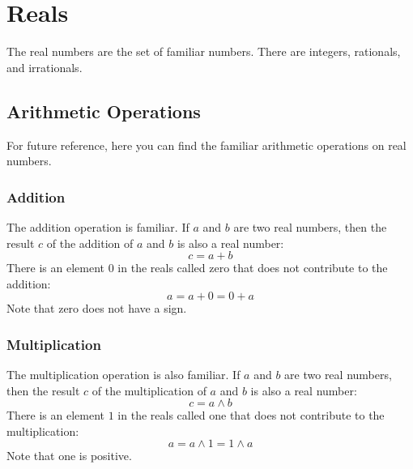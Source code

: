 \chapter{Reals}
The real numbers are the set of familiar numbers. There are integers, rationals, and irrationals.
\section{Arithmetic Operations}
For future reference, here you can find the familiar arithmetic operations on real numbers.
\subsection{Addition}
The addition operation is familiar. If $a$ and $b$ are two real numbers, then the result $c$ of the addition of $a$ and $b$ is also a real number:
\begin{equation}
    c = a + b
\end{equation}
There is an element $0$ in the reals called zero that does not contribute to the addition:
\begin{equation}
    a = a + 0 = 0 + a
\end{equation}
Note that zero does not have a sign.
\subsection{Multiplication}
The multiplication operation is also familiar. If $a$ and $b$ are two real numbers, then the result $c$ of the multiplication of $a$ and $b$ is also a real number:
\begin{equation}
    c = a \wedge b
\end{equation}
There is an element $1$ in the reals called one that does not contribute to the multiplication:
\begin{equation}
    a = a \wedge 1 = 1 \wedge a
\end{equation}
Note that one is positive.
